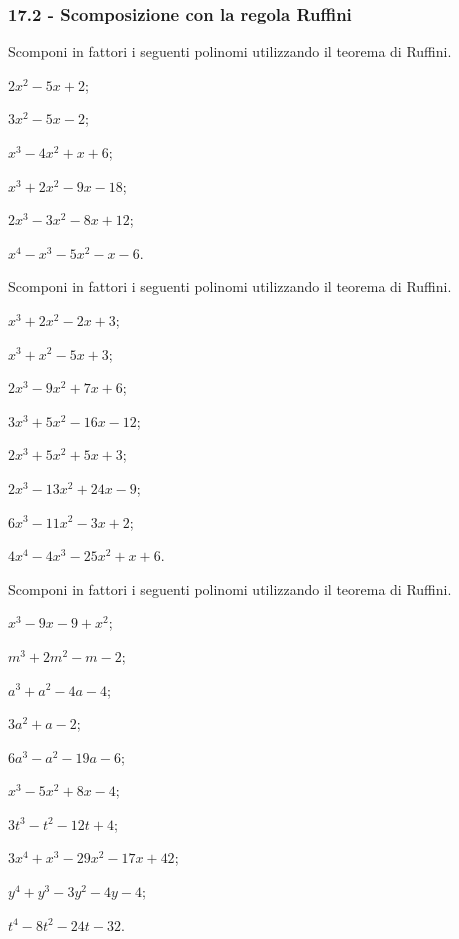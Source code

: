 \subsubsection*{17.2 - Scomposizione con la regola Ruffini}

\begin{esercizio}
\label{ese:17.11}
Scomponi in fattori i seguenti polinomi utilizzando il teorema di
Ruffini.
\begin{multicols}{3}
 \begin{enumeratea}
 \item $2x^{2}-5x+2$;
\item $3x^{2}-5x-2$;
\item $x^{3}-4x^{2}+x+6$;
\item $x^{3}+2x^{2}-9x-18$;
\item $2x^{3}-3x^{2}-8x+12$;
\item $x^{4}-x^{3}-5x^{2}-x-6$.
 \end{enumeratea}
\end{multicols}
\end{esercizio}

\begin{esercizio}
\label{ese:17.12}
Scomponi in fattori i seguenti polinomi utilizzando il teorema di
Ruffini.
\begin{multicols}{2}
 \begin{enumeratea}
 \item $x^{3}+2x^{2}-2x+3$;
\item $x^{3}+x^{2}-5x+3$;
\item $2x^{3}-9x^{2}+7x+6$;
\item $3x^{3}+5x^{2}-16x-12$;
\item $2x^{3}+5x^{2}+5x+3$;
\item $2x^{3}-13x^{2}+24x-9$;
\item $6x^{3}-11x^{2}-3x+2$;
\item $4x^{4}-4x^{3}-25x^{2}+x+6$.
 \end{enumeratea}
\end{multicols}
\end{esercizio}

\begin{esercizio}[\Ast]
\label{ese:17.13}
Scomponi in fattori i seguenti polinomi utilizzando il teorema di
Ruffini.
\begin{multicols}{2}
 \begin{enumeratea}
 \item $x^{3}-9x-9+x^{2}$;
\item $m^{3}+2m^{2}-m-2$;
\item $a^{3}+a^{2}-4a-4$;
\item $3a^{2}+a-2$;
\item $6a^{3}-a^{2}-19a-6$;
\item $x^{3}-5x^{2}+8x-4$;
\item $3t^{3}-t^{2}-12t+4$;
\item $3x^{4}+x^{3}-29x^{2}-17x+42$;
\item $y^{4}+y^{3}-3y^{2}-4y-4$;
\item $t^{4}-8t^{2}-24t-32$.
 \end{enumeratea}
\end{multicols}
\end{esercizio}


